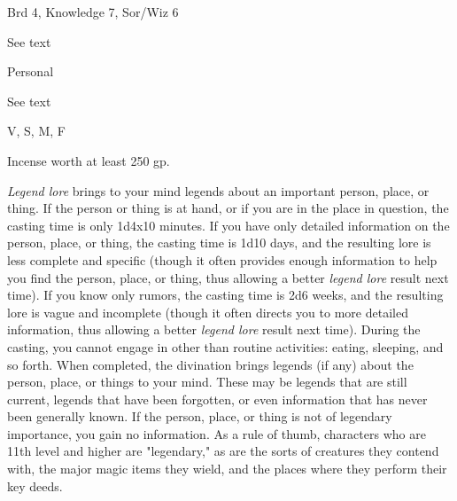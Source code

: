 
\begin{description*}
\item[Level:] Brd 4, Knowledge 7, Sor/Wiz 6
\item[Casting Time:] See text
\item[Range:] Personal
\item[Duration:] See text
\item[Components:] V, S, M, F
\item[Arcane Material Component:] Incense worth at least 250 gp.
\end{description*}

\textit{Legend lore} brings to your mind legends about an important person, place,
or thing. If the person or thing is at hand, or if you are in the place in question,
the casting time is only 1d4x10 minutes. If you have only detailed information
on the person, place, or thing, the casting time is 1d10 days, and the resulting
lore is less complete and specific (though it often provides enough information
to help you find the person, place, or thing, thus allowing a better \textit{legend
lore} result next time). If you know only rumors, the casting time is 2d6 weeks,
and the resulting lore is vague and incomplete (though it often directs you to
more detailed information, thus allowing a better \textit{legend lore} result next
time).
During the casting, you cannot engage in other than routine activities: eating,
sleeping, and so forth. When completed, the divination brings legends (if any)
about the person, place, or things to your mind. These may be legends that are
still current, legends that have been forgotten, or even information that has never
been generally known. If the person, place, or thing is not of legendary importance,
you gain no information. As a rule of thumb, characters who are 11th level and
higher are "legendary," as are the sorts of creatures they contend with, the
major magic items they wield, and the places where they perform their key deeds.